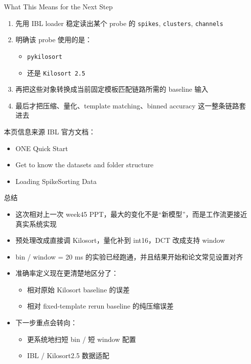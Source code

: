 \documentclass[aspectratio=169,11pt]{beamer}
\begin{document}
\begin{frame}{What This Means for the Next Step}
  \small
  \begin{enumerate}
    \item 先用 IBL loader 稳定读出某个 probe 的 \texttt{spikes}, \texttt{clusters}, \texttt{channels}
    \item 明确该 probe 使用的是：
    \begin{itemize}
      \item \texttt{pykilosort}
      \item 还是 \texttt{Kilosort 2.5}
    \end{itemize}
    \item 再把这些对象转换成当前固定模板匹配链路所需的 baseline 输入
    \item 最后才把压缩、量化、template matching、binned accuracy 这一整条链路套进去
  \end{enumerate}

  \begin{block}{本页信息来源}
    IBL 官方文档：
    \begin{itemize}
      \item ONE Quick Start
      \item Get to know the datasets and folder structure
      \item Loading SpikeSorting Data
    \end{itemize}
  \end{block}
\end{frame}

\begin{frame}{总结}
  \begin{itemize}
    \item 这次相对上一次 week45 PPT，最大的变化不是“新模型”，而是\alert{工作流更接近真实系统实现}
    \item 预处理改成直接调 Kilosort，量化补到 int16，DCT 改成支持 window
    \item bin / window = 20 ms 的实验已经跑通，并且结果开始和论文常见设置对齐
    \item 准确率定义现在更清楚地区分了：
    \begin{itemize}
      \item 相对原始 Kilosort baseline 的误差
      \item 相对 fixed-template rerun baseline 的纯压缩误差
    \end{itemize}
    \item 下一步重点会转向：
    \begin{itemize}
      \item 更系统地扫短 bin / 短 window 配置
      \item IBL / Kilosort2.5 数据适配
    \end{itemize}
  \end{itemize}
\end{frame}
\end{document}
